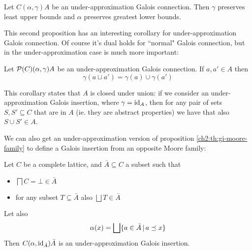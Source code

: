 \begin{prop}\label{ch2:th:under-gc-adjoints-preserve-lub-glb}
	Let $C (\alpha, \gamma) A$ be an under-approximation Galois connection. Then $\gamma$ preserves least upper bounds and $\alpha$ preserves greatest lower bounds.
\end{prop}

This second proposition has an interesting corollary for under-approximation Galois connection. Of course it's dual holds for ``normal" Galois connection, but in the under-approximation case is much more important:
\begin{corollary}\label{ch2:th:under-gc-union-closure}
	Let $\mathcal{P}(C) (\alpha, \gamma) A$ be an under-approximation Galois connection. If $a, a' \in A$ then
	\[
	\gamma(a \sqcup a') = \gamma(a) \cup \gamma(a')
	\]
\end{corollary}

This corollary states that $A$ is closed under union: if we consider an under-approximation Galois insertion, where $\gamma = \text{id}_A$, then for any pair of sets $S, S' \subseteq C$ that are in $A$ (ie. they are abstract properties) we have that also $S \cup S' \in A$.

We can also get an under-approximation version of proposition \ref{ch2:th:gi-moore-family} to define a Galois insertion from an opposite Moore family:
\begin{prop}\label{ch2:th:under-gi-moore-family}
	Let $C$ be a complete lattice, and $\bar{A} \subseteq C$ a subset such that
	\begin{itemize}
		\item $\bigsqcap C = \bot \in \bar{A}$
		\item for any subset $T \subseteq \bar{A}$ also $\bigsqcup T \in \bar{A}$
	\end{itemize}
	Let also
	\[
	\alpha(x) = \bigsqcup \{ a \in \bar{A} \,\vert\, a \preceq x \}
	\]
	Then $C(\alpha, \text{id}_{\bar{A}}) \bar{A}$ is an under-approximation Galois insertion.
\end{prop}

